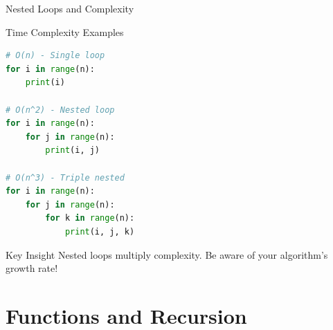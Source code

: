 \documentclass[aspectratio=169,xcolor=dvipsnames]{beamer}
\begin{document}
\begin{frame}[fragile]{Nested Loops and Complexity}
  \begin{exampleblock}{Time Complexity Examples}
    \begin{lstlisting}[language=Python,basicstyle=\small\ttfamily]
# O(n) - Single loop
for i in range(n):
    print(i)

# O(n^2) - Nested loop
for i in range(n):
    for j in range(n):
        print(i, j)

# O(n^3) - Triple nested
for i in range(n):
    for j in range(n):
        for k in range(n):
            print(i, j, k)
    \end{lstlisting}
  \end{exampleblock}

  \begin{alertblock}{Key Insight}
    Nested loops multiply complexity. Be aware of your algorithm's growth rate!
  \end{alertblock}
\end{frame}

\section{Functions and Recursion}
\end{document}
